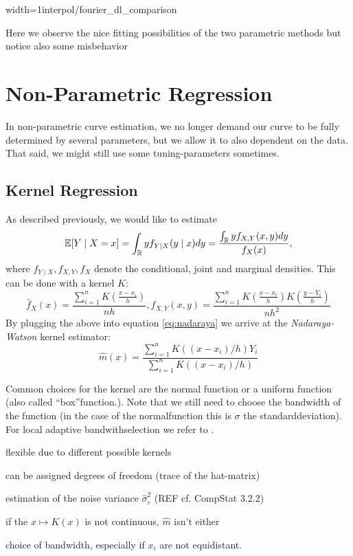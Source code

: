 		\begin{my_figure}[h]{width=1\textwidth}{interpol/fourier_dl_comparison}
			\caption{Here we observe the nice fitting possibilities of the two parametric methods but notice also some misbehavior}
			\label{fig:interpol/fourier_dl_comparison}
		\end{my_figure}



\section{Non-Parametric Regression}
	\label{sec:itpl_nonparametric}
	In non-parametric curve estimation, we no longer demand our curve to be fully determined by several parameters, but we allow it to also dependent on the data. That said, we might still use some tuning-parameters sometimes.

	\subsection{Kernel Regression}
		\label{sec:Kernel}
		As described previously, we would like to estimate
		\begin{equation}
			\label{eq:nadaraya}
			\mathbb{E}[Y \mid X=x]
			= \int_{\mathbb{R}} y f_{Y \mid X}(y \mid x) d y
			=\frac{\int_{\mathbb{R}} y f_{X, Y}(x, y) d y}{f_{X}(x)},
		\end{equation}
		where $f_{Y \mid X}, f_{X, Y}, f_{X}$ denote the conditional, joint and marginal densities.
		This can be done with a kernel $K$:
		$$
			\hat{f}_{X}(x)=\frac{\sum_{i=1}^{n} K\left(\frac{x-x_{i}}{h}\right)}{n h}, \hat{f}_{X, Y}(x, y)=\frac{\sum_{i=1}^{n} K\left(\frac{x-x_{i}}{h}\right) K\left(\frac{y-Y_{i}}{h}\right)}{n h^{2}}
		$$
		By plugging the above into equation \eqref{eq:nadaraya} we arrive at the \textit{Nadaraya-Watson} kernel estimator:
		$$\hat{m}(x)=\frac{\sum_{i=1}^{n} K\left(\left(x-x_{i}\right) / h\right) Y_{i}}{\sum_{i=1}^{n} K\left(\left(x-x_{i}\right) / h\right)}$$

		Common choices for the kernel are the normal function or a uniform function (also called ``box''function.). Note that we still need to choose the bandwidth of the function (in the case of the normalfunction this is $\sigma$ the standarddeviation). For local adaptive bandwithselection we refer to \cite{brockmannLocallyAdaptiveBandwidth1993}.

		\begin{my_pros_cons_table}{
				\item flexible due to different possible kernels
				\item can be assigned degrees of freedom (trace of the hat-matrix)
				\item estimation of the noise variance $\hat \sigma_\varepsilon^2$ (REF cf. CompStat 3.2.2)
			}{
				\item if the $x \mapsto K(x)$ is not continuous, $\hat m $ isn't either
				\item choice of bandwidth, especially if $x_i$ are not equidistant.
			}
		\end{my_pros_cons_table}


